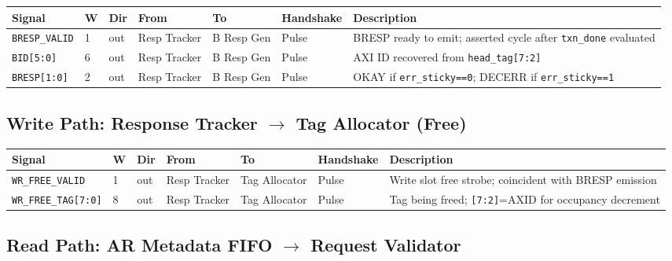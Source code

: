 \documentclass[11pt,a4paper]{article}
\begin{document}
\begin{tabularx}{\textwidth}{L{3.0cm} C{0.8cm} C{1.0cm} L{2.2cm} L{2.2cm} L{2.0cm} X}
\toprule
\textbf{Signal} & \textbf{W} & \textbf{Dir} & \textbf{From} & \textbf{To} & \textbf{Handshake} & \textbf{Description} \\
\midrule
\texttt{BRESP\_VALID}  & 1 & out & Resp Tracker & B Resp Gen & Pulse & BRESP ready to emit; asserted cycle after \texttt{txn\_done} evaluated \\
\texttt{BID[5:0]}      & 6 & out & Resp Tracker & B Resp Gen & Pulse & AXI ID recovered from \texttt{head\_tag[7:2]} \\
\texttt{BRESP[1:0]}    & 2 & out & Resp Tracker & B Resp Gen & Pulse & OKAY if \texttt{err\_sticky==0}; DECERR if \texttt{err\_sticky==1} \\
\bottomrule
\end{tabularx}

\subsection{Write Path: Response Tracker $\rightarrow$ Tag Allocator (Free)}

\begin{tabularx}{\textwidth}{L{3.0cm} C{0.8cm} C{1.0cm} L{2.2cm} L{2.2cm} L{2.0cm} X}
\toprule
\textbf{Signal} & \textbf{W} & \textbf{Dir} & \textbf{From} & \textbf{To} & \textbf{Handshake} & \textbf{Description} \\
\midrule
\texttt{WR\_FREE\_VALID}   & 1 & out & Resp Tracker & Tag Allocator & Pulse & Write slot free strobe; coincident with BRESP emission \\
\texttt{WR\_FREE\_TAG[7:0]} & 8 & out & Resp Tracker & Tag Allocator & Pulse & Tag being freed; \texttt{[7:2]}=AXID for occupancy decrement \\
\bottomrule
\end{tabularx}

\subsection{Read Path: AR Metadata FIFO $\rightarrow$ Request Validator}
\end{document}

